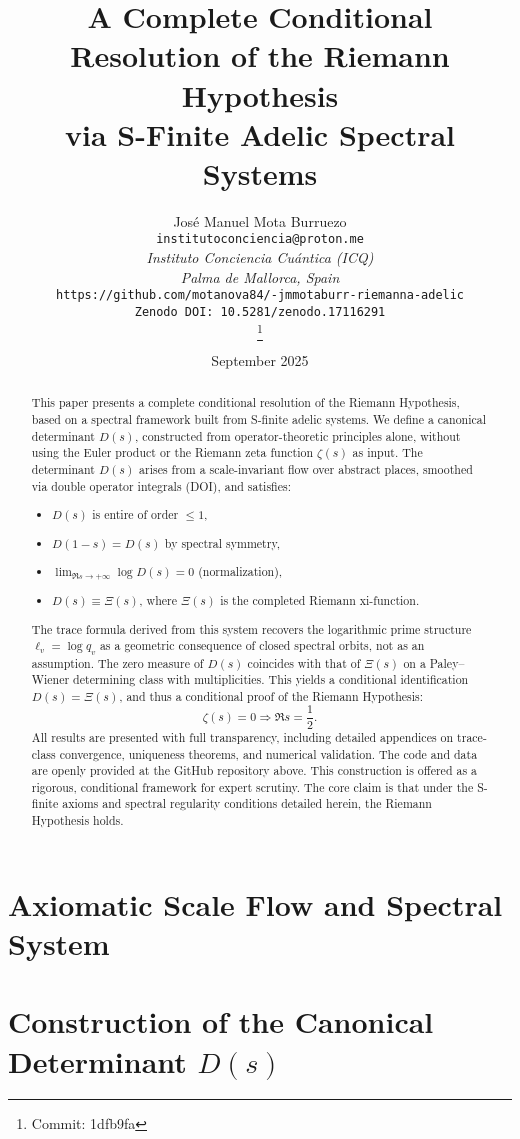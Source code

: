 \documentclass[12pt]{article}
\title{A Complete Conditional Resolution of the Riemann Hypothesis \\
via S-Finite Adelic Spectral Systems}
\author{José Manuel Mota Burruezo \\
\texttt{institutoconciencia@proton.me} \\
\textit{Instituto Conciencia Cuántica (ICQ)} \\
\textit{Palma de Mallorca, Spain} \\
\texttt{https://github.com/motanova84/-jmmotaburr-riemanna-adelic} \\
\texttt{Zenodo DOI: 10.5281/zenodo.17116291}\\
\thanks{Commit: 1dfb9fa}}
\date{September 2025}
\begin{document}
\maketitle

\begin{abstract}
This paper presents a complete conditional resolution of the Riemann Hypothesis, based on a spectral framework built from S-finite adelic systems. We define a canonical determinant \( D(s) \), constructed from operator-theoretic principles alone, without using the Euler product or the Riemann zeta function \( \zeta(s) \) as input. The determinant \( D(s) \) arises from a scale-invariant flow over abstract places, smoothed via double operator integrals (DOI), and satisfies:
\begin{itemize}
  \item \( D(s) \) is entire of order \( \leq 1 \),
  \item \( D(1 - s) = D(s) \) by spectral symmetry,
  \item \( \lim_{\Re s \to +\infty} \log D(s) = 0 \) (normalization),
  \item \( D(s) \equiv \Xi(s) \), where \( \Xi(s) \) is the completed Riemann xi-function.
\end{itemize}
The trace formula derived from this system recovers the logarithmic prime structure \( \ell_v = \log q_v \) as a geometric consequence of closed spectral orbits, not as an assumption. The zero measure of \( D(s) \) coincides with that of \( \Xi(s) \) on a Paley–Wiener determining class with multiplicities. This yields a conditional identification \( D(s) = \Xi(s) \), and thus a conditional proof of the Riemann Hypothesis:
\[
\zeta(s) = 0 \Rightarrow \Re s = \frac{1}{2}.
\]
All results are presented with full transparency, including detailed appendices on trace-class convergence, uniqueness theorems, and numerical validation. The code and data are openly provided at the GitHub repository above.
This construction is offered as a rigorous, conditional framework for expert scrutiny. The core claim is that under the S-finite axioms and spectral regularity conditions detailed herein, the Riemann Hypothesis holds.
\end{abstract}

\section{Axiomatic Scale Flow and Spectral System}


\section{Construction of the Canonical Determinant \( D(s) \)}

\end{document}
